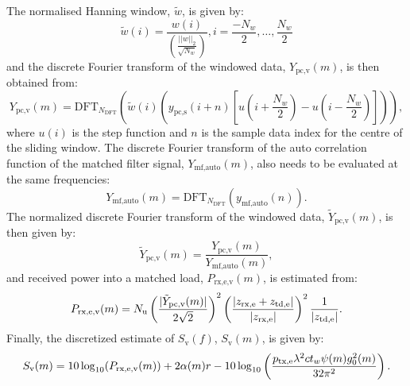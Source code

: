 \documentclass[preprint,12pt,TurnOnLineNumbers]{JASAnew}
\newcommand{\freqsym}{f}
\newcommand{\samplesymt}{n}
\newcommand{\samplesymf}{m}
\newcommand{\genidxsym}{i}
\newcommand{\nchannels}{N_{\textrm{u}}}
\newcommand{\zrxe}{z_{\textrm{rx,e}}}
\newcommand{\ztde}{z_{\textrm{td,e}}}
\newcommand{\ptxe}{p_{\textrm{tx,e}}}
\newcommand{\ypcspread}{y_{\textrm{pc,s}}}
\newcommand{\ymfauto}{y_{\textrm{mf,auto}}}
\newcommand{\ypcvolumef}{Y_{\textrm{pc,v}}}
\newcommand{\ypcvolumenormf}{\tilde{Y}_{\textrm{pc,v}}}
\newcommand{\ymfautof}{Y_{\textrm{mf,auto}}}
\newcommand{\prxevf}{P_{\textrm{rx,e,v}}}
\newcommand{\hannw}{w}
\newcommand{\hannwnorm}{\tilde{\hannw}}
\newcommand{\nw}{N_{\hannw}}
\newcommand{\tslide}{t_w}
\newcommand{\sv}{S_{\textrm{v}}}
\newcommand{\range}{r}
\newcommand{\gainzero}{g_0}
\newcommand{\eqang}{\psi}
\newcommand{\wlen}{\lambda}
\newcommand{\cw}{c}
\newcommand{\absorp}{\alpha}
\newcommand{\dft}{\textrm{DFT}}
\newcommand{\ndft}{{N_{\textrm{DFT}}}}
\begin{document}
The normalised Hanning window, $\hannwnorm$, is given by: 
%
\begin{equation}
\label{eq:hannw}
\hannwnorm(\genidxsym) = \frac{\hannw(\genidxsym)}{\left( \frac{||\hannw||_2}{\sqrt{\nw}} \right)}, i = \frac{-\nw}{2}, \ldots, \frac{\nw}{2}
\end{equation}
%
and the discrete Fourier transform of the windowed data, $\ypcvolumef(\samplesymf)$, is then obtained from:
%
\begin{equation}
\label{eq:FFT_volume}
\ypcvolumef(\samplesymf) = \dft_\ndft 
\left( \hannwnorm(\genidxsym) \left(\ypcspread (\genidxsym+\samplesymt) \left[ u(\genidxsym + \frac{\nw}{2}) - u(\genidxsym - \frac{\nw}{2}) \right] \right) \right),
\end{equation}
%
where $u(\genidxsym)$ is the step function and $\samplesymt$ is the sample data index for the centre of the sliding window. The discrete Fourier transform of the auto correlation function of the matched filter signal, $\ymfautof(\samplesymf)$, also needs to be evaluated at the same frequencies:
%
\begin{equation}
\label{eq:FFT_TX_Auto}
\ymfautof(\samplesymf)  =  \dft_\ndft (\ymfauto(\samplesymt)).
\end{equation}
%
The normalized discrete Fourier transform of the windowed data, $\ypcvolumenormf(\samplesymf)$, is then given by:
%
\begin{equation}
\label{eq:FFT_volume_norm}
\ypcvolumenormf(\samplesymf) = \frac{\ypcvolumef(\samplesymf)}{\ymfautof(\samplesymf)},
\end{equation}
%
and received power into a matched load, $\prxevf(\samplesymf)$, is estimated from:
%
\begin{equation}
\label{eq:prx_FFT_volume}
\prxevf(\samplesymf) = \nchannels \left( \frac{|\ypcvolumenormf(\samplesymf)|}{2\sqrt{2}} \right)^2 \left( \frac{|\zrxe+\ztde|}{|\zrxe|}\right)^2 \\
\frac{1}{|\ztde|}. %
\end{equation}
%
Finally, the discretized estimate of $\sv(\freqsym)$, $\sv(\samplesymf)$, is given by:
%
\begin{equation}
\label{eq:Sv_FFT}
\sv(\samplesymf) = 10\log_{10}(\prxevf(\samplesymf)) + 2\absorp(\samplesymf) \range \\
- 10\log_{10}\left( \frac{\ptxe \wlen^2 \cw \tslide \eqang(\samplesymf) \gainzero^2(\samplesymf) }{32\pi^2} \right).
\end{equation}
\end{document}
